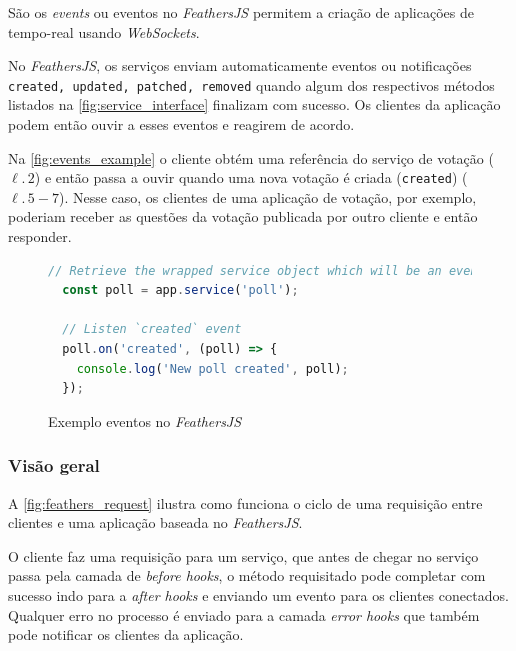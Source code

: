 São os \textit{events} ou eventos no \textit{\textit{FeathersJS}} permitem
a criação de aplicações de tempo-real usando \textit{WebSockets}.

No \textit{\textit{FeathersJS}}, os serviços enviam automaticamente eventos ou notificações
\texttt{created, updated, patched, removed} quando algum dos respectivos métodos listados
na \autoref{fig:service_interface} finalizam com sucesso.
Os clientes da aplicação podem então ouvir a esses eventos e reagirem de acordo.

Na \autoref{fig:events_example} o cliente obtém uma referência do serviço
de votação ($\ell.\,2$) e então passa a ouvir quando uma nova votação é criada (\texttt{created}) ($\ell.\,5-7$).
Nesse caso, os clientes de uma aplicação de votação, por exemplo, poderiam
receber as questões da votação publicada por outro cliente e então responder.

\begin{figure}[h]
\caption{Exemplo eventos no \textit{\textit{FeathersJS}}}
\label{fig:events_example}
\begin{lstlisting}[language=JavaScript]
  // Retrieve the wrapped service object which will be an event emitter
  const poll = app.service('poll');

  // Listen `created` event
  poll.on('created', (poll) => {
    console.log('New poll created', poll);
  });
\end{lstlisting}
\doautor
\end{figure}

\subsubsection{Visão geral}

A \autoref{fig:feathers_request} ilustra como funciona o ciclo de uma requisição
entre clientes e uma aplicação baseada no \textit{FeathersJS}.

O cliente faz uma requisição para um serviço, que antes de chegar no serviço passa
pela camada de \textit{before hooks}, o método requisitado pode completar com sucesso indo para a
\textit{after hooks} e enviando um evento para os clientes conectados. Qualquer erro no processo
é enviado para a camada \textit{error hooks} que também pode notificar os clientes da aplicação.

